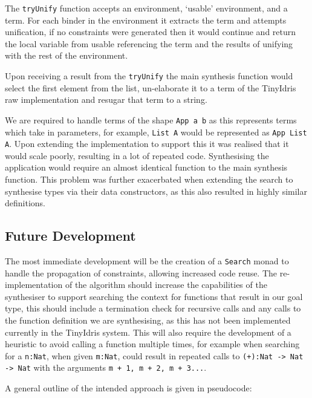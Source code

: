 \documentclass[a4paper]{article}
\begin{document}
The \texttt{tryUnify} function accepts an environment, `usable' environment, and a term. For each binder in the environment it 
extracts the term and attempts unification, if no constraints were generated then it would continue and return the 
local variable from usable referencing the term and the results of unifying with the rest of the environment.

Upon receiving a result from the \texttt{tryUnify} the main synthesis function would select the first element from the list, 
un-elaborate it to a term of the TinyIdris raw implementation and resugar that term to a string. 

We are required to handle terms of the shape \texttt{App a b} as this represents terms which take in parameters, for example, 
\texttt{List A} would be represented as \texttt{App List A}. Upon extending the implementation to support this it was realised that
it would scale poorly, resulting in a lot of repeated code. Synthesising the application would require an almost identical
function to the main synthesis function. This problem was further exacerbated when extending the search 
to synthesise types via their data constructors, as this also resulted in highly similar definitions. 

\clearpage
\subsection{Future Development}
\label{sec:org7c39e30}

The most immediate development will be the creation of a \texttt{Search} monad to handle the propagation of constraints, allowing 
increased code reuse. The re-implementation of the algorithm should increase the capabilities of the synthesiser to support searching
the context for functions that result in our goal type, this should include a termination check for 
recursive calls and any calls to the function definition we are synthesising, as this has not been implemented currently
in the TinyIdris system. This will also require the development of a heuristic to avoid calling a function multiple times, for example
when searching for a \texttt{n:Nat}, when given \texttt{m:Nat}, could result in repeated calls to \texttt{(+):Nat -> Nat -> Nat} with the arguments 
\texttt{m + 1, m + 2, m + 3...}. 

A general outline of the intended approach is given in pseudocode:
\end{document}
